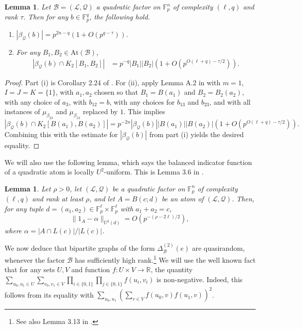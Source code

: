 \documentclass[12pt,oneside,british,a4wide]{amsart}
\newtheorem{lemma}[theorem]{Lemma}
\numberwithin{equation}{section}
\theoremstyle{definition}
\def\F{\mathbb{F}}
\newcommand{\calL}{\mathcal{L}}
\newcommand{\calB}{\mathcal{B}}
\newcommand{\calQ}{\mathcal{Q}}
\newcommand{\At}{{\mathrm{At}}}
\begin{document}
\begin{lemma}\label{lem:sizeofbetaref}
Let $\calB=(\calL,\calQ)$ a quadratic factor on $\F_p^n$ of complexity $(\ell,q)$ and rank $\tau$. Then for any $b\in \F_p^q$, the following hold.
\begin{enumerate}
\item $|\beta_{\calQ}(b)|=p^{2n-q}(1+O(p^{q-\tau}))$.
\item For any $B_1,B_2\in \At(\calB)$, 
\begin{align*}
|\beta_{\calQ}(b)\cap K_2[B_1,B_2]|&=p^{-q}|B_1||B_2|(1+O(p^{O(\ell+q)-\tau/2})).
\end{align*} 
\end{enumerate}
\end{lemma}
\begin{proof}
Part (i) is Corollary 2.24 of \cite{Terry.2021d}.  For (ii), apply Lemma A.2 in \cite{Terry.2021d} with $m=1$, $I=J=K=\{1\}$, with $a_1,a_2$ chosen so that $B_1=B(a_1)$ and $B_2=B_2(a_2)$, with any choice of $a_3$, with $b_{12}=b$,  with any choices for $b_{13}$ and $b_{23}$, and with all instances of $\mu_{\beta_{23}}$ and $\mu_{\beta_{13}}$ replaced by $1$.  This implies 
$$
|\beta_{\calQ}(b)\cap K_2[B(a_1),B(a_2)]|=p^{-2n}|\beta_{\calQ}(b)||B(a_1)||B(a_2)|(1+O(p^{O(\ell+q)-\tau/2})).
$$
Combining this with the estimate for $|\beta_{\calQ}(b)|$ from part (i) yields the desired equality.  
\end{proof}

We will also use the following lemma, which says the balanced indicator function of a quadratic atom is locally $U^2$-uniform. This is Lemma 3.6 in \cite{Terry.2021d}.

\begin{lemma}\label{lem:quadatuni}
Let $\rho>0$, let $(\calL,\calQ)$ be a quadratic factor on $\F_p^n$ of complexity $(\ell,q)$ and rank at least $\rho$, and let $A=B(c;d)$ be an atom of $(\calL,\calQ)$. Then, for any tuple $d=(a_1,a_2)\in \F_p^{\ell}\times \F_p^{\ell}$ with $a_1+a_2=c$,
\[\|1_A-\alpha\|_{U^2(d)}=O(p^{-(\rho-2\ell)/2}),\]
where $\alpha=|A\cap L(c)|/|L(c)|$.
\end{lemma}

We now deduce that bipartite graphs of the form $\Delta^{(2)}_{\calB}(e)$ are quasirandom, whenever the factor $\calB$ has sufficiently high rank.\footnote{See also Lemma 3.13 in \cite{Terry.2021av2}.} We will use the well known fact that for any sets $U,V$ and function $f:U\times V\rightarrow \mathbb{R}$, the quantity $\sum_{u_0,u_1\in U}\sum_{v_0,v_1\in V}\prod_{i\in \{0,1\}}\prod_{j\in \{0,1\}}f(u_i,v_i)$ is non-negative.  Indeed, this follows from its equality with $\sum_{u_0,u_1}(\sum_{v\in V}f(u_0,v)f(u_1,v))^2$.
\end{document}
